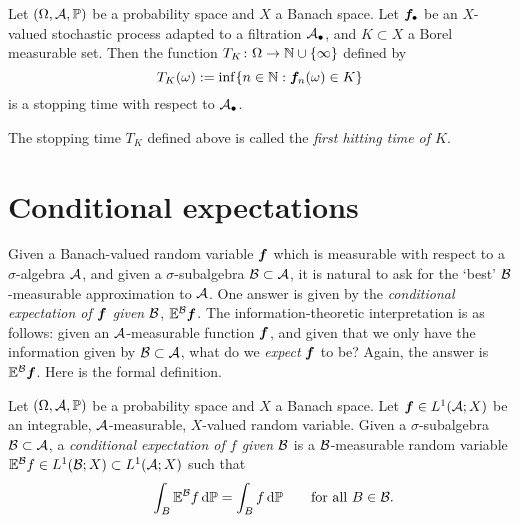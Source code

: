 \begin{prop}\label{prop:first-hitting-time}
  Let $(\Omega, \mathcal{A}, \mathbb{P})$ be a probability space and $X$ a Banach space.
  Let $\bm{f}_{\bullet}$ be an $X$-valued stochastic process adapted to a filtration $\mathcal{A}_{\bullet}$, and $K \subset X$ a Borel measurable set.
  Then the function $T_K \colon \Omega \rightarrow \mathbb{N} \cup \{\infty\}$ defined by
  \begin{equation*}
    T_K(\omega) := \inf\{n \in \mathbb{N} : \bm{f}_n(\omega) \in K \}
  \end{equation*}
  is a stopping time with respect to $\mathcal{A}_{\bullet}$.
\end{prop}

The stopping time $T_K$ defined above is called the \emph{first hitting time of $K$}.

\section{Conditional expectations}

Given a Banach-valued random variable $\bm{f}$ which is measurable with respect to a $\sigma$-algebra $\mathcal{A}$, and given a $\sigma$-subalgebra $\mathcal{B} \subset \mathcal{A}$, it is natural to ask for the `best' $\mathcal{B}$-measurable approximation to $\mathcal{A}$.
One answer is given by the \emph{conditional expectation of $\bm{f}$ given $\mathcal{B}$}, $\mathbb{E}^{\mathcal{B}} \bm{f}$.
The information-theoretic interpretation is as follows: given an $\mathcal{A}$-measurable function $\bm{f}$, and given that we only have the information given by $\mathcal{B} \subset \mathcal{A}$, what do we \emph{expect} $\bm{f}$ to be? Again, the answer is $\mathbb{E}^{\mathcal{B}} \bm{f}$.
Here is the formal definition.

\begin{defn}\label{defn:conditional-expectation}
  Let $(\Omega, \mathcal{A}, \mathbb{P})$ be a probability space and $X$ a Banach space.
  Let $\bm{f} \in L^1(\mathcal{A}; X)$ be an integrable, $\mathcal{A}$-measurable, $X$-valued random variable.
  Given a $\sigma$-subalgebra $\mathcal{B} \subset \mathcal{A}$, a \emph{conditional expectation of $f$ given $\mathcal{B}$} is a $\mathcal{B}$-measurable random variable $\mathbb{E}^{\mathcal{B}}f \in L^1(\mathcal{B}; X) \subset L^1(\mathcal{A};X)$ such that
  \begin{equation}\label{eq:conditional-expectation-property}
    \qquad \int_B \mathbb{E}^{\mathcal{B}}f \, \mathrm{d}\mathbb{P} = \int_B f \, \mathrm{d}\mathbb{P} \qquad \text{for all $B \in \mathcal{B}$.}
  \end{equation}
\end{defn}

